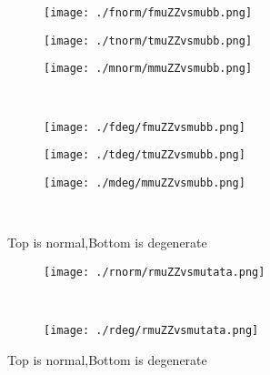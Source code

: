 \documentclass[aps,floats,floatfix,nofootinbib]{revtex4-1}
\begin{document}
\begin{center}
\begin{figure}
\begin{subfigure}{0.3\textwidth}
\texttt{[image: ./fnorm/fmuZZvsmubb.png]}
\label{}
\end{subfigure}
\begin{subfigure}{0.3\textwidth}
\texttt{[image: ./tnorm/tmuZZvsmubb.png]}
\label{}
\end{subfigure}
\begin{subfigure}{0.3\textwidth}
\texttt{[image: ./mnorm/mmuZZvsmubb.png]}
\label{}
\end{subfigure}\\
\begin{subfigure}{0.3\textwidth}
\texttt{[image: ./fdeg/fmuZZvsmubb.png]}
\label{}
\end{subfigure}
\begin{subfigure}{0.3\textwidth}
\texttt{[image: ./tdeg/tmuZZvsmubb.png]}
\label{}
\end{subfigure}
\begin{subfigure}{0.3\textwidth}
\texttt{[image: ./mdeg/mmuZZvsmubb.png]}
\label{}
\end{subfigure}\\
\caption{Top is normal,Bottom is degenerate}
\end{figure}
\end{center}

\begin{center}
\begin{figure}
\begin{subfigure}{0.95\textwidth}
\texttt{[image: ./rnorm/rmuZZvsmutata.png]}
\label{}
\end{subfigure}\\
\begin{subfigure}{0.95\textwidth}
\texttt{[image: ./rdeg/rmuZZvsmutata.png]}
\label{}
\end{subfigure}
\caption{Top is normal,Bottom is degenerate}
\end{figure}
\end{center}
\end{document}
